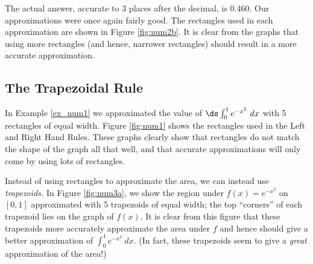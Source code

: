 \begin{solution}
{{
}



The actual answer, accurate to 3 places after the decimal, is 0.460. Our approximations were once again fairly good. The rectangles used in each approximation are shown in Figure \ref{fig:num2b}. It is clear from the graphs that using more rectangles (and hence, narrower rectangles) should result in a more accurate approximation.
}
\end{solution}





\subsection{The Trapezoidal Rule}

In Example \ref{ex_num1} we approximated the value of $\ds \int_0^1 e^{-x^2}\ dx$ with 5 rectangles of equal width. Figure \ref{fig:num1} shows the rectangles used in the Left and Right Hand Rules. These graphs clearly show that rectangles do not match the shape of the graph all that well, and that accurate approximations will only come by using lots of rectangles. 

Instead of using rectangles to approximate the area, we can instead use \textit{trapezoids.} In Figure \ref{fig:num3a}, we show the region under $f(x) = e^{-x^2}$ on $[0,1]$ approximated with 5 trapezoids of equal width; the top ``corners'' of each trapezoid lies on the graph of $f(x)$. It is clear from this figure that these trapezoids more accurately approximate the area under $f$ and hence should give a better approximation of $\int_0^1 e^{-x^2}\ dx$. (In fact, these trapezoids seem to give a \textit{great} approximation of the area!)

